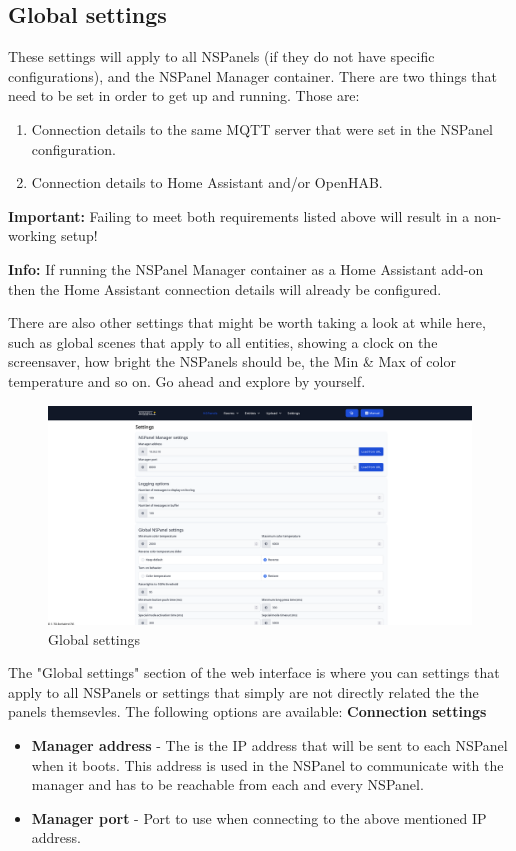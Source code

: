 \documentclass[10pt]{article}
\newcommand{\info}[1]{\begin{infoBox} \textbf{Info:} #1 \end{infoBox}}
\newcommand{\important}[1]{\begin{importantBox} \textbf{Important:} #1 \end{importantBox}}
\begin{document}
    \hypertarget{sec:global_settings}{}
    \subsection{Global settings}
    These settings will apply to all NSPanels (if they do not have specific configurations), and the NSPanel Manager container. There are two things that need to be set in order to get up and running. Those are:
    \begin{enumerate}
      \item Connection details to the same MQTT server that were set in the NSPanel configuration.
      \item Connection details to Home Assistant and/or OpenHAB.
    \end{enumerate}
    \important{Failing to meet both requirements listed above will result in a non-working setup!}
    \info{If running the NSPanel Manager container as a Home Assistant add-on then the Home Assistant connection details will already be configured.}
    There are also other settings that might be worth taking a look at while here, such as global scenes that apply to all entities, showing a clock on the screensaver, how bright the NSPanels should be, the Min \& Max of color temperature and so on. Go ahead and explore by yourself.
    \begin{figure}[H]
    \centering
    \includegraphics[scale=0.25]{settings_page.png}
    \caption{Global settings}%
    \end{figure}

    The "Global settings" section of the web interface is where you can settings that apply to all NSPanels or settings that simply are not directly related the the panels themsevles. The following options are available:
     \textbf{Connection settings}
    \begin{itemize}
      \item \textbf{Manager address} - The is the IP address that will be sent to each NSPanel when it boots. This address is used in the NSPanel to communicate with the manager and has to be reachable from each and every NSPanel.
      \item \textbf{Manager port} - Port to use when connecting to the above mentioned IP address.
    \end{itemize}
\end{document}
